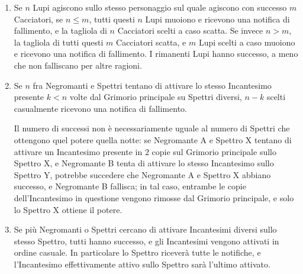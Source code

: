 \documentclass[a4paper,10pt]{article}
\begin{document}
\begin{enumerate}
	\item Se $n$ Lupi agiscono sullo stesso personaggio sul quale agiscono con successo $m$ Cacciatori, se $n\le m$, tutti questi $n$ Lupi muoiono e ricevono una notifica di fallimento, e la tagliola di $n$ Cacciatori scelti a caso scatta.
	      Se invece $n>m$, la tagliola di tutti questi $m$ Cacciatori scatta, e $m$ Lupi scelti a caso muoiono e ricevono una notifica di fallimento. I rimanenti Lupi hanno successo, a meno che non falliscano per altre ragioni.



	\item Se $n$ fra Negromanti e Spettri tentano di attivare lo stesso Incantesimo presente $k<n$ volte dal Grimorio principale su Spettri diversi, $n-k$ scelti casualmente ricevono una notifica di fallimento.

	      Il numero di successi non è necessariamente uguale al numero di Spettri che ottengono quel potere quella notte: se Negromante A e Spettro X tentano di attivare un Incantesimo presente in $2$ copie sul Grimorio principale sullo Spettro X, e Negromante B tenta di attivare lo stesso Incantesimo sullo Spettro Y, potrebbe succedere che Negromante A e Spettro X abbiano successo, e Negromante B fallisca; in tal caso, entrambe le copie dell'Incantesimo in questione vengono rimosse dal Grimorio principale, e solo lo Spettro X ottiene il potere.

	\item Se più Negromanti o Spettri cercano di attivare Incantesimi diversi sullo stesso Spettro, tutti hanno successo, e gli Incantesimi vengono attivati in ordine casuale. In particolare lo Spettro riceverà tutte le notifiche, e l'Incantesimo effettivamente attivo sullo Spettro sarà l'ultimo attivato.


\end{enumerate}
\end{document}
